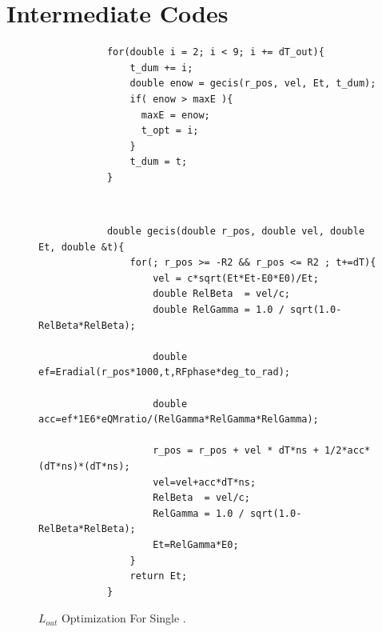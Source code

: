 \documentclass[a4paper,oneside,12pt]{report}
\numberwithin{equation}{chapter}
\begin{document}
{ %

\appendix
\chapter{Intermediate Codes} \label{appendix:intermediate_codes}
\vspace{30pt}
\begin{figure}[H]
    \centering
    \begin{minipage}{\textwidth}
        \centering
        \begin{verbatim}
            for(double i = 2; i < 9; i += dT_out){
                t_dum += i;
                double enow = gecis(r_pos, vel, Et, t_dum);
                if( enow > maxE ){
                  maxE = enow;
                  t_opt = i;
                }
                t_dum = t;
            }
        \end{verbatim}
    \end{minipage} 
    \\
    \vspace{10pt}
    \begin{minipage}{\textwidth}
        \centering
        \begin{verbatim}
            double gecis(double r_pos, double vel, double Et, double &t){
                for(; r_pos >= -R2 && r_pos <= R2 ; t+=dT){
                    vel = c*sqrt(Et*Et-E0*E0)/Et;
                    double RelBeta  = vel/c;
                    double RelGamma = 1.0 / sqrt(1.0-RelBeta*RelBeta);
                
                    double ef=Eradial(r_pos*1000,t,RFphase*deg_to_rad);
                
                    double acc=ef*1E6*eQMratio/(RelGamma*RelGamma*RelGamma); 
                
                    r_pos = r_pos + vel * dT*ns + 1/2*acc*(dT*ns)*(dT*ns);
                    vel=vel+acc*dT*ns;
                    RelBeta  = vel/c;
                    RelGamma = 1.0 / sqrt(1.0-RelBeta*RelBeta);
                    Et=RelGamma*E0; 
                }
                return Et;
            }
        \end{verbatim}
    \end{minipage}
    \vspace{0pt}
    \caption{$L_{out}$ Optimization For Single \e.}
    \label{fig:lout_opt_single_e}
\end{figure}

}
\end{document}
